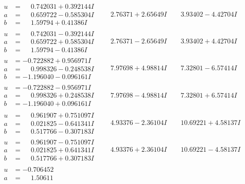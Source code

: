 \documentclass[1p]{elsarticle_modified}
\theoremstyle{definition}
\begin{document}
$$\begin{array}{c|c|c}
\begin{aligned}
u &= \phantom{-}0.742031 + 0.392144 I \\
a &= \phantom{-}0.659722 - 0.585304 I \\
b &= \phantom{-}1.59794 + 0.41386 I\end{aligned}
 & \phantom{-}2.76371 + 2.65649 I & \phantom{-}3.93402 - 4.42704 I \\ \hline\begin{aligned}
u &= \phantom{-}0.742031 - 0.392144 I \\
a &= \phantom{-}0.659722 + 0.585304 I \\
b &= \phantom{-}1.59794 - 0.41386 I\end{aligned}
 & \phantom{-}2.76371 - 2.65649 I & \phantom{-}3.93402 + 4.42704 I \\ \hline\begin{aligned}
u &= -0.722882 + 0.956971 I \\
a &= \phantom{-}0.998326 - 0.248538 I \\
b &= -1.196040 - 0.096161 I\end{aligned}
 & \phantom{-}7.97698 + 4.98814 I & \phantom{-}7.32801 - 6.57414 I \\ \hline\begin{aligned}
u &= -0.722882 - 0.956971 I \\
a &= \phantom{-}0.998326 + 0.248538 I \\
b &= -1.196040 + 0.096161 I\end{aligned}
 & \phantom{-}7.97698 - 4.98814 I & \phantom{-}7.32801 + 6.57414 I \\ \hline\begin{aligned}
u &= \phantom{-}0.961907 + 0.751097 I \\
a &= \phantom{-}0.021825 - 0.641341 I \\
b &= \phantom{-}0.517766 - 0.307183 I\end{aligned}
 & \phantom{-}4.93376 - 2.36104 I & \phantom{-}10.69221 + 4.58137 I \\ \hline\begin{aligned}
u &= \phantom{-}0.961907 - 0.751097 I \\
a &= \phantom{-}0.021825 + 0.641341 I \\
b &= \phantom{-}0.517766 + 0.307183 I\end{aligned}
 & \phantom{-}4.93376 + 2.36104 I & \phantom{-}10.69221 - 4.58137 I \\ \hline\begin{aligned}
u &= -0.706452\phantom{ +0.000000I} \\
a &= \phantom{-}1.50611\phantom{ +0.000000I} \\

\end{aligned}
\end{array}$$
\end{document}
